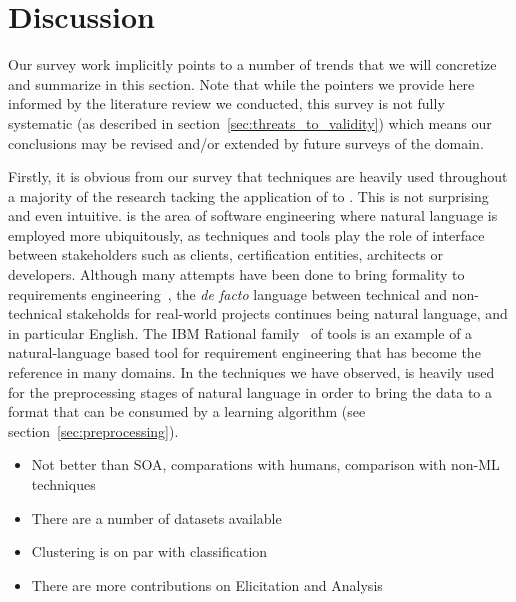 \section{Discussion}

Our survey work implicitly points to a number of trends that we will
concretize and summarize in this section. Note that while the pointers we
provide here informed by the literature review we conducted, this survey is not
fully systematic (as described in section~\ref{sec:threats_to_validity}) which
means our conclusions may be revised and/or extended by future surveys of the
domain.

Firstly, it is obvious from our survey that \NLP techniques are heavily used
throughout a majority of the research tacking the application of \ML to
\RE. This is not surprising and even intuitive. \RE is the area of software
engineering where natural language is employed more ubiquitously, as \RE
techniques and tools play the role of interface between stakeholders such as
clients, certification entities, architects or developers. Although many
attempts have been done to bring formality to requirements
engineering~\cite{Teufl17,LucioRCA16}, the \emph{de facto} language between
technical and non-technical stakeholds for real-world projects continues being natural language, and in particular English.
The IBM Rational \DOORS family~\cite{doors} of tools is an example
of a natural-language based tool for requirement engineering that has become the
reference in many domains. In the techniques we have observed, \NLP is heavily
used for the preprocessing stages of natural language in order to bring the data to a format
that can be consumed by a learning algorithm (see
section~\ref{sec:preprocessing}). 



\begin{itemize}
  \item Not better than SOA, comparations with humans, comparison with non-ML
  techniques
  \item There are a number of datasets available
  \item Clustering is on par with classification
  \item There are more contributions on Elicitation and Analysis
\end{itemize}



